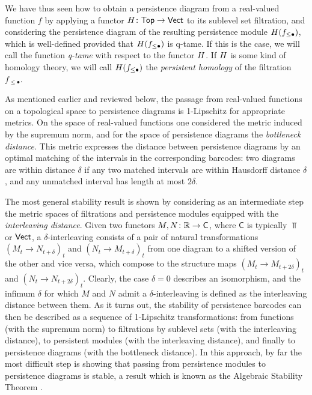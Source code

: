 We have thus seen how to obtain a persistence diagram from a real-valued function $f$ by applying a functor $H \colon \mathsf{Top} \to \mathsf{Vect}$ to its sublevel set filtration, and considering the persistence diagram of the resulting persistence module $H(f_{\leq \bullet})$, which is well-defined provided that $H(f_{\leq \bullet})$ is q-tame.
If this is the case, we will call the function \emph{q-tame} with respect to the functor $H$.
If $H$ is some kind of homology theory, we will call $H(f_{\leq \bullet})$ the \emph{persistent homology} of the filtration $f_{\leq \bullet}$.

As mentioned earlier and reviewed below, the passage from real-valued functions on a topological space to persistence diagrams is 1-Lipschitz for appropriate metrics.
On the space of real-valued functions one considered the metric induced by the supremum norm, and for the space of persistence diagrams the \emph{bottleneck distance}.
This metric expresses the distance between persistence diagrams by an optimal matching of the intervals in the corresponding barcodes: two diagrams are within distance $\delta$ if any two matched intervals are within Hausdorff distance $\delta$, and any unmatched interval has length at most $2\delta$.

The most general stability result is shown by considering as an intermediate step the metric spaces of filtrations and persistence modules equipped with the \emph{interleaving distance}.
Given two functors $M,N \colon \mathbb{R} \to \mathsf C$, where $\mathsf C$ is typically $\Top$ or $\mathsf{Vect}$, a $\delta$-interleaving consists of a pair of natural transformations $(M_t \to N_{t+\delta})_t$ and $(N_t \to M_{t+\delta})_t$ from one diagram to a shifted version of the other and vice versa, which compose to the structure maps $(M_t \to M_{t+2\delta})_t$ and $(N_t \to N_{t+2\delta})_t$.
Clearly, the case $\delta=0$ describes an isomorphism, and the infimum $\delta$ for which $M$ and $N$ admit a $\delta$-interleaving is defined as the interleaving distance between them.
As it turns out, the stability of persistence barcodes can then be described as a sequence of 1-Lipschitz transformations: from functions (with the supremum norm) to filtrations by sublevel sets (with the interleaving distance), to persistent modules (with the interleaving distance), and finally to persistence diagrams (with the bottleneck distance).
In this approach, by far the most difficult step is showing that passing from persistence modules to persistence diagrams is stable, a result which is known as the Algebraic Stability Theorem  \cite{10.1145/1542362.1542407,Chazal.2016a,MR3333456, MR2279866}.
